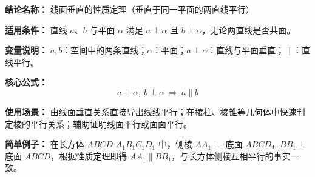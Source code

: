 \textbf{结论名称：} 线面垂直的性质定理（垂直于同一平面的两直线平行）

\textbf{适用条件：} 直线 \(a\)、\(b\) 与平面 \(\alpha\) 满足 \(a\perp\alpha\) 且 \(b\perp\alpha\)，无论两直线是否共面。

\textbf{变量说明：} \(a,b\)：空间中的两条直线；\(\alpha\)：平面；\(a\perp\alpha\)：直线与平面垂直；\(\parallel\)：直线平行。

\textbf{核心公式：}
\[
\boxed{a\perp\alpha,\ b\perp\alpha \ \Rightarrow\ a\parallel b}
\]

\textbf{使用场景：} 由线面垂直关系直接导出线线平行；在棱柱、棱锥等几何体中快速判定棱的平行关系；辅助证明线面平行或面面平行。

\textbf{简单例子：} 在长方体 \(ABCD\text{-}A_1B_1C_1D_1\) 中，侧棱 \(AA_1\perp\) 底面 \(ABCD\)，\(BB_1\perp\) 底面 \(ABCD\)，根据性质定理即得 \(AA_1\parallel BB_1\)，与长方体侧棱互相平行的事实一致。